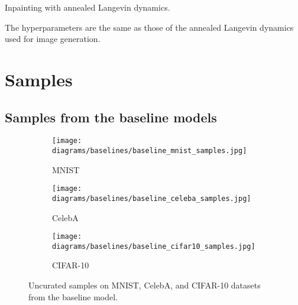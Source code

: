 \documentclass{article}
\begin{document}
\begin{algorithm}[h]
	\caption{Inpainting with annealed Langevin dynamics.}
	\label{alg:inpaint}
	\begin{algorithmic}[1]
	    \Require{} 
	    \Require{} 
	        \State{} 
	        \State{}
                \State{}
                \State{}
            \EndFor
            \State{}
        \EndFor
        \item[]
        \Return{}
	\end{algorithmic}
\end{algorithm}
The hyperparameters are the same as those of the annealed Langevin dynamics used for image generation.

\newpage
\section{Samples}\label{app:samples}
\subsection{Samples from the baseline models}\label{app:baseline}
\vspace*{\fill}
\FloatBarrier
\begin{figure}[H]
    \centering
    \begin{subfigure}[b]{0.3\textwidth}
        \texttt{[image: diagrams/baselines/baseline\_mnist\_samples.jpg]}
        \caption{MNIST}
        \label{fig:baseline_mnist}
    \end{subfigure}
    \begin{subfigure}[b]{0.3\textwidth}
        \texttt{[image: diagrams/baselines/baseline\_celeba\_samples.jpg]}
        \caption{CelebA}
        \label{fig:baseline_celeba}
    \end{subfigure}
    \begin{subfigure}[b]{0.3\textwidth}
        \texttt{[image: diagrams/baselines/baseline\_cifar10\_samples.jpg]}
        \caption{CIFAR-10}
        \label{fig:baseline_cifar10}
    \end{subfigure}
    \caption{Uncurated samples on MNIST, CelebA, and CIFAR-10 datasets from the baseline model.}
    \label{fig:baseline_samples}
\end{figure}
\end{document}

